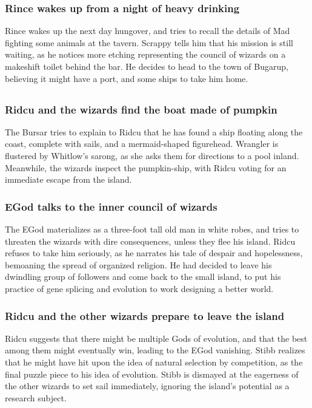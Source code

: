 \subsubsection{\Gls{Rince} wakes up from a night of heavy drinking}
\Gls{Rince} wakes up the next day hungover, and tries to recall the details of \Gls{Mad} fighting
some animals at the tavern. \Gls{Scrappy} tells him that his mission is still waiting, as he notices
more etching representing the council of wizards on a makeshift toilet behind the bar. He decides to
head to the town of Bugarup, believing it might have a port, and some ships to take him home.

\subsection{}
\subsubsection{\Gls{Ridcu} and the wizards find the boat made of pumpkin}
The \Gls{Bursar} tries to explain to \Gls{Ridcu} that he has found a ship floating along the
coast, complete with sails, and a mermaid-shaped figurehead. \Gls{Wrangler} is flustered by
\Gls{Whitlow}'s sarong, as she asks them for directions to a pool inland. Meanwhile, the wizards
inspect the pumpkin-ship, with \Gls{Ridcu} voting for an immediate escape from the island.

\subsubsection{\Gls{EGod} talks to the inner council of wizards}
The \Gls{EGod} materializes as a three-foot tall old man in white robes, and tries to threaten
the wizards with dire consequences, unless they flee his island. \Gls{Ridcu} refuses to take him
seriously, as he narrates his tale of despair and hopelessness, bemoaning the spread of organized
religion. He had decided to leave his dwindling group of followers and come back to the small
island, to put his practice of gene splicing and evolution to work designing a better world.

\subsubsection{\Gls{Ridcu} and the other wizards prepare to leave the island}
\Gls{Ridcu} suggests that there might be multiple Gods of evolution, and that the best among them
might eventually win, leading to the \Gls{EGod} vanishing. \Gls{Stibb} realizes that he might have
hit upon the idea of natural selection by competition, as the final puzzle piece to his idea of
evolution. \Gls{Stibb} is dismayed at the eagerness of the other wizards to set sail immediately,
ignoring the island's potential as a research subject.


